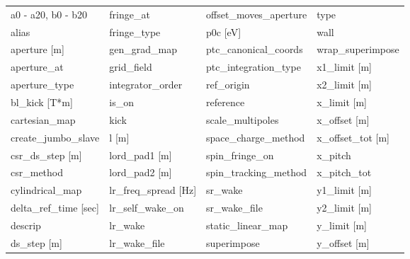  \begin{tabular}{llll} \toprule
a0 - a20, b0 - b20               & fringe_at                        & offset_moves_aperture            & type                             \\
alias                            & fringe_type                      & p0c [eV]                         & wall                             \\
aperture [m]                     & gen_grad_map                     & ptc_canonical_coords             & wrap_superimpose                 \\
aperture_at                      & grid_field                       & ptc_integration_type             & x1_limit [m]                     \\
aperture_type                    & integrator_order                 & ref_origin                       & x2_limit [m]                     \\
bl_kick [T*m]                    & is_on                            & reference                        & x_limit [m]                      \\
cartesian_map                    & kick                             & scale_multipoles                 & x_offset [m]                     \\
create_jumbo_slave               & l [m]                            & space_charge_method              & x_offset_tot [m]                 \\
csr_ds_step [m]                  & lord_pad1 [m]                    & spin_fringe_on                   & x_pitch                          \\
csr_method                       & lord_pad2 [m]                    & spin_tracking_method             & x_pitch_tot                      \\
cylindrical_map                  & lr_freq_spread [Hz]              & sr_wake                          & y1_limit [m]                     \\
delta_ref_time [sec]             & lr_self_wake_on                  & sr_wake_file                     & y2_limit [m]                     \\
descrip                          & lr_wake                          & static_linear_map                & y_limit [m]                      \\
ds_step [m]                      & lr_wake_file                     & superimpose                      & y_offset [m]                     \\

\end{tabular}
